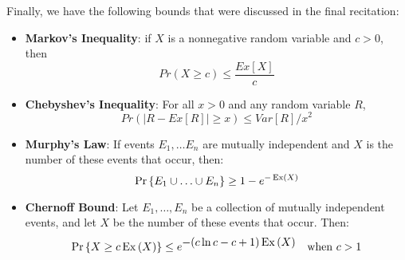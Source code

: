 \documentclass[11pt]{article}
\begin{document}
	Finally, we have the following bounds that were discussed in the final recitation:
	
	\begin{itemize}
		\item \textbf{Markov's Inequality}: if $X$ is a nonnegative random variable and
		$c>0$, then
		$$Pr(X \geq c) \leq \frac{Ex[X]}{c}$$
		
		\item \textbf{Chebyshev's Inequality}: For all $x > 0$ and any random variable $R$,
		$$Pr(|R - Ex[R]| \geq x) \leq Var[R]/x^2$$
		
		\item \textbf{Murphy's Law}: If events $E_1, \ldots E_n$ are mutually independent 
		and $X$ is the number of these events that occur, then:
	\[
	\mathop{\textup{Pr}}\nolimits\left\{E_1 \cup \ldots \cup E_n\right\} \geq 1 - e^{-\operatorname{Ex}\left(X\right)}
	\]
	\item \textbf{Chernoff Bound}: Let $E_1, \ldots, E_n$ be a collection of mutually independent events,
and let $X$ be the number of these events that occur.  Then:
%
\begin{align*}
\mathop{\textup{Pr}}\nolimits\left\{X \geq c \operatorname{Ex}\left(X\right)\right\} & \leq e^{\textstyle -(c \ln c - c + 1) \operatorname{Ex}\left(X\right)}
    & \text{when $c > 1$}
\end{align*}

	\end{itemize}
\end{document}
